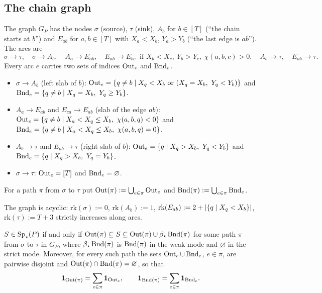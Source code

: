 \subsection{The chain graph}

\begin{definition}\label{def:graph}
The graph $G_P$ has the nodes $\sigma$ (source), $\tau$ (sink), $A_b$ for $b\in[T]$ (``the chain starts at $b$'') and $E_{ab}$ for $a,b\in[T]$ with $X_a<X_b$, $Y_a>Y_b$ (``the last edge is $ab$''). The arcs are
\[
\sigma\to\tau,\quad \sigma\to A_b,\quad A_a\to E_{ab},\quad E_{ab}\to E_{bc}\ \text{ if }X_b<X_c,\ Y_b>Y_c,\ \chi(a,b,c)>0,\quad A_b\to\tau,\quad E_{ab}\to\tau.
\]
Every arc $e$ carries two sets of indices $\operatorname{Out}_e$ and $\operatorname{Bnd}_e$.
\begin{itemize}
\item $\sigma\to A_b$ (left slab of $b$): $\Out_e=\set{q\ne b\mid X_q<X_b\ \text{or}\ (X_q=X_b,\ Y_q<Y_b)}$ and $\operatorname{Bnd}_e=\left\{ q\ne b\mid X_q=X_b,\ Y_q\ge Y_b \right\}$.
\item $A_a\to E_{ab}$ and $E_{ca}\to E_{ab}$ (slab of the edge $ab$): $\Out_e=\set{q\ne b\mid X_a<X_q\le X_b,\ \chi(a,b,q)<0}$ and $\Bnd_e=\set{q\ne b\mid X_a<X_q\le X_b,\ \chi(a,b,q)=0}$.
\item $A_b\to\tau$ and $E_{ab}\to\tau$ (right slab of $b$): $\Out_e=\set{q\mid X_q>X_b,\ Y_q<Y_b}$ and $\operatorname{Bnd}_e=\left\{ q\mid X_q>X_b,\ Y_q=Y_b \right\}$.
\item $\sigma\to\tau$: $\operatorname{Out}_e=[T]$ and $\operatorname{Bnd}_e=\varnothing$.
\end{itemize}
For a path $\pi$ from $\sigma$ to $\tau$ put $\operatorname{Out}(\pi):=\bigcup_{e\in\pi}\operatorname{Out}_e$ and $\operatorname{Bnd}(\pi):=\bigcup_{e\in\pi}\operatorname{Bnd}_e$.
\end{definition}

The graph is acyclic: $\mathrm{rk}(\sigma):=0$, $\mathrm{rk}(A_b):=1$, $\mathrm{rk}(E_{ab}):=2+\left\lvert \left\{ q\mid X_q<X_b \right\} \right\rvert$, $\mathrm{rk}(\tau):=T+3$ strictly increases along arcs.

\begin{theorem}[family]\label{thm:family}
$S\in\operatorname{Sp}_\star(P)$ if and only if $\operatorname{Out}(\pi)\subseteq S\subseteq\operatorname{Out}(\pi)\cup\beta_\star\operatorname{Bnd}(\pi)$ for some path $\pi$ from $\sigma$ to $\tau$ in $G_P$, where $\beta_\star\operatorname{Bnd}(\pi)$ is $\operatorname{Bnd}(\pi)$ in the weak mode and $\varnothing$ in the strict mode. Moreover, for every such path the sets $\operatorname{Out}_e\cup\operatorname{Bnd}_e$, $e\in\pi$, are pairwise disjoint and $\operatorname{Out}(\pi)\cap\operatorname{Bnd}(\pi)=\varnothing$, so that
\begin{equation}\label{eq:disjoint}
\mathbf 1_{\operatorname{Out}(\pi)}=\sum_{e\in\pi}\mathbf 1_{\operatorname{Out}_e},\qquad \mathbf 1_{\operatorname{Bnd}(\pi)}=\sum_{e\in\pi}\mathbf 1_{\operatorname{Bnd}_e}.
\end{equation}
\end{theorem}

